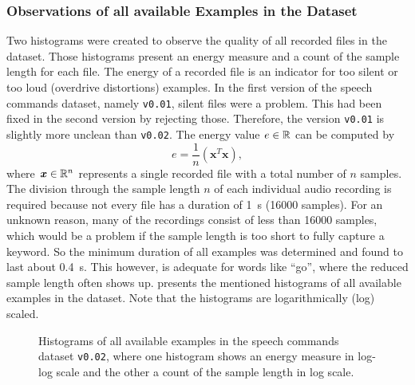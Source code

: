 \subsubsection{Observations of all available Examples in the Dataset}
Two histograms were created to observe the quality of all recorded files in the dataset.
Those histograms present an energy measure and a count of the sample length for each file.
The energy of a recorded file is an indicator for too silent or too loud (overdrive distortions) examples.
In the first version of the speech commands dataset, namely \texttt{v0.01}, silent files were a problem.
This had been fixed in the second version by rejecting those.
Therefore, the version \texttt{v0.01} is slightly more unclean than \texttt{v0.02}.
The energy value $e \in \mathbb{R}$ can be computed by
\begin{equation}\label{eq:exp_dataset_energy}
  e = \frac{1}{n} \left( \bm{x}^T \bm{x} \right),
\end{equation}
where $\bm{x} \in \mathbb{R}^n$ represents a single recorded file with a total number of $n$ samples.
The division through the sample length $n$ of each individual audio recording is required because not every file has a duration of \SI{1}{\second} (16000 samples).
For an unknown reason, many of the recordings consist of less than 16000 samples, which would be a problem if the sample length is too short to fully capture a keyword.
So the minimum duration of all examples was determined and found to last about \SI{0.4}{\second}.
This however, is adequate for words like \enquote{go}, where the reduced sample length often shows up.
 presents the mentioned histograms of all available examples in the dataset.
Note that the histograms are logarithmically (log) scaled.
\begin{figure}[!ht]
  \centering
    \qquad
  \caption{Histograms of all available examples in the speech commands dataset \texttt{v0.02}, where one histogram shows an energy measure in log-log scale and the other a count of the sample length in log scale.}
  \label{fig:exp_dataset_hist}
\end{figure}
